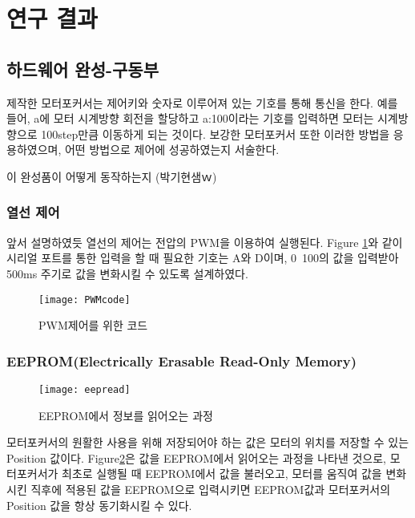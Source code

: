 \section{연구 결과}


\subsection{하드웨어 완성-구동부}
 제작한 모터포커서는 제어키와 숫자로 이루어져 있는 기호를 통해 통신을 한다. 예를 들어, a에 모터 시계방향 회전을 할당하고 a:100이라는 기호를 입력하면 모터는 시계방향으로 100step만큼 이동하게 되는 것이다. 보강한 모터포커서 또한 이러한 방법을 응용하였으며, 어떤 방법으로 제어에 성공하였는지 서술한다.

이 완성품이 어떻게 동작하는지 (박기현샘ｗ)


\subsubsection{열선 제어}

 앞서 설명하였듯 열선의 제어는 전압의 PWM을 이용하여 실행된다. \textrm{Figure} \ref{PWM}와 같이 시리얼 포트를 통한 입력을 할 때 필요한 기호는 A와 D이며, 0~100의 값을 입력받아 500ms 주기로 값을 변화시킬 수 있도록 설계하였다.
 
  \begin{figure}[ht]
 	\begin{center}
 		\texttt{[image: PWMcode]}
 	\end{center}
 	\caption{PWM제어를 위한 코드}
 	\label{PWM}
 \end{figure}
 
\subsubsection{EEPROM(Electrically Erasable Read-Only Memory)}

 \begin{figure}[ht]
	\begin{center}
		\texttt{[image: eepread]}
	\end{center}
	\caption{EEPROM에서 정보를 읽어오는 과정}
	\label{eepread}
\end{figure}

 모터포커서의 원활한 사용을 위해 저장되어야 하는 값은 모터의 위치를 저장할 수 있는 Position 값이다. \textrm{Figure}\ref{eepread}은 값을 EEPROM에서 읽어오는 과정을 나타낸 것으로, 모터포커서가 최초로 실행될 때 EEPROM에서 값을 불러오고, 모터를 움직여 값을 변화시킨 직후에 적용된 값을 EEPROM으로 입력시키면 EEPROM값과 모터포커서의 Position 값을 항상 동기화시킬 수 있다.
 
